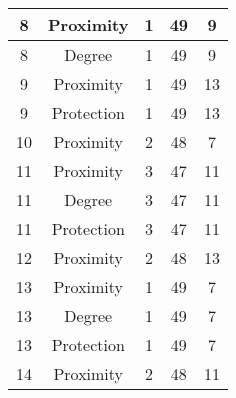 \documentclass[results.tex]{subfiles}
\begin{document}
\begin{center}
\begin{tabular}{| c || c | c | c | c |}
            \hline
            8                       & Proximity                    & 1                      & 49                      & 9                    \\
            \hline
            8                       & Degree                       & 1                      & 49                      & 9                    \\
            \hline
            9                       & Proximity                    & 1                      & 49                      & 13                   \\
            \hline
            9                       & Protection                   & 1                      & 49                      & 13                   \\
            \hline
            10                      & Proximity                    & 2                      & 48                      & 7                    \\
            \hline
            11                      & Proximity                    & 3                      & 47                      & 11                   \\
            \hline
            11                      & Degree                       & 3                      & 47                      & 11                   \\
            \hline
            11                      & Protection                   & 3                      & 47                      & 11                   \\
            \hline
            12                      & Proximity                    & 2                      & 48                      & 13                   \\
            \hline
            13                      & Proximity                    & 1                      & 49                      & 7                    \\
            \hline
            13                      & Degree                       & 1                      & 49                      & 7                    \\
            \hline
            13                      & Protection                   & 1                      & 49                      & 7                    \\
            \hline
            14                      & Proximity                    & 2                      & 48                      & 11                   \\

\end{tabular}
\end{center}
\end{document}
